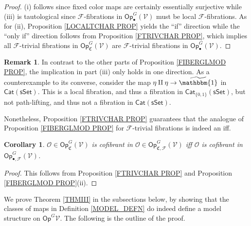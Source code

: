 \documentclass[a4paper,10pt
,draft
]{article}%
\numberwithin{equation}{section}
\numberwithin{figure}{section}
\newtheorem{corollary}[equation]{Corollary}%
\theoremstyle{definition} %
\newtheorem{remark}[equation]{Remark}%
\newcommand{\Op}{\mathsf{Op}}%
\newcommand{\F}{\ensuremath{\mathcal F}}
\newcommand{\V}{\ensuremath{\mathcal V}}
\renewcommand{\O}{\ensuremath{\mathcal O}}
\newcommand{\1}{\ensuremath{\mathbbm 1}}%
\begin{document}
\begin{proof}
	(i) follows since fixed color maps are certainly essentially surjective while (iii) is tautological since 
	$\F$-fibrations in $\mathsf{Op}_{\bullet}^G(\V)$ must be local $\F$-fibrations.
	As for (ii), 
	Proposition \ref{LOCALTCHAR PROP} yields the ``if'' direction
	while the ``only if'' direction follows from 
	Proposition \ref{FTRIVCHAR PROP}, 
	which implies all $\F$-trivial fibrations in $\mathsf{Op}_{\mathfrak{C}}^G(\V)$
	are $\F$-trivial fibrations in 
	$\mathsf{Op}_{\bullet}^G(\V)$.
\end{proof}



\begin{remark}
In contrast to the other parts of 
Proposition \ref{FIBERGLMOD PROP},
the implication in part (iii) 
only holds in one direction. 
As a counterexample to its converse, 
consider the map $\eta \amalg \eta \to \widetilde{\mathbbm{1}}$
in $\mathsf{Cat}(\mathsf{sSet})$. This is a local fibration, 
and thus a fibration in $\mathsf{Cat}_{\{0,1\}}(\mathsf{sSet})$,
but not path-lifting, and thus not a fibration in $\mathsf{Cat}(\mathsf{sSet})$.

Nonetheless, Proposition \ref{FTRIVCHAR PROP}
guarantees that the analogue of Proposition \ref{FIBERGLMOD PROP}
for $\F$-trivial fibrations is indeed an iff.
\end{remark}



\begin{corollary}
      $\O \in \Op^G_{\mathfrak C}(\V)$ is cofibrant in
      $\O \in \Op^G_{\mathfrak C,\mathcal{F}}(\V)$
      iff $\O$ is cofibrant in $\Op^G_{\bullet,\F}(\V)$.
\end{corollary}

\begin{proof}
      This follows from Proposition \ref{FTRIVCHAR PROP} and Proposition \ref{FIBERGLMOD PROP}(ii).
\end{proof}


We prove Theorem \ref{THMIII} in the subsections below,
by showing that the classes of maps in Definition \ref{MODEL_DEFN}
do indeed define a model structure on $\mathsf{Op}^G{\V}$.
The following is the outline of the proof.
\end{document}
